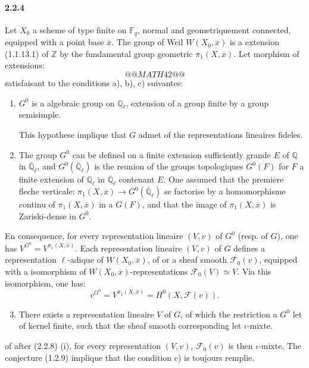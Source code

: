 \documentclass[12pt,a4paper]{article}
\theoremstyle{plain}
\theoremstyle{definition}
\theoremstyle{remark}
\newcommand{\FF}{{\mathbb{F}}}
\newcommand{\QQ}{{\mathbb{Q}}}
\newcommand{\ZZ}{{\mathbb{Z}}}
\newcommand{\QQbar}{{\overline{\QQ}}}
\begin{document}
\paragraph{2.2.4}
Let $X_0$ a scheme of type finite on $\FF_q$, normal and geometriquement connected, equipped with a point base $\overline{x}$. The group of Weil $W(X_0, \overline{x})$ is a extension (1.1.13.1) of $\ZZ$ by the fundamental group geometric $\pi_1(X, \overline{x})$. Let morphism of extensions:
\[
@@MATH42@@
\]
satisfaisant to the conditions a), b), c) suivantes:
\begin{enumerate}[label=\alph*)]
\item $G^0$ is a algebraic group on $\QQ_\ell$, extension of a group finite by a group semisimple.

This hypothese implique that $G$ admet of the representations lineaires fideles.
\item The group $G^0$ can be defined on a finite extension sufficiently grande $E$ of $\QQ$ in $\QQbar_\ell$, and $G^0(\QQbar_\ell)$ is the reunion of the groups topologiques $G^0(F)$ for $F$ a finite extension of $\QQ_\ell$ in $\QQbar_\ell$ contenant $E$. One assumed that the premiere fleche verticale: $\pi_1(X, \overline{x}) \to G^0(\QQbar_\ell)$ se factorise by a homomorphisme continu of $\pi_1(X, \overline{x})$ in a $G(F)$, and that the image of $\pi_1(X, \overline{x})$ is Zariski-dense in $G^0$.
\end{enumerate}

En consequence, for every representation lineaire $(V, v)$ of $G^0$ (resp. of $G$), one has $V^{G^0} = V^{\pi_1(X, \overline{x})}$. Each representation lineaire $(V, v)$ of $G$ defines a representation $\ell$-adique of $W(X_0, \overline{x})$, of or a sheaf smooth $\mathscr{F}_0(v)$, equipped with a isomorphism of $W(X_0, \overline{x})$-representations $\mathscr{F}_0(V) \simeq V$. Via this isomorphism, one has:
\[ v^{G^0} = V^{\pi_1(X, \overline{x})} = H^0(X, \mathscr{F}(v)). \]

\begin{enumerate}[label=\alph*)]
\setcounter{enumi}{2}
\item There exists a representation lineaire $V$ of $G$, of which the restriction a $G^0$ let of kernel finite, such that the sheaf smooth corresponding let $\iota$-mixte.
\end{enumerate}
of after (2.2.8) (i), for every representation $(V, v)$, $\mathscr{F}_0(v)$ is then $\iota$-mixte. The conjecture (1.2.9) implique that the condition c) is toujours remplie.
\end{document}
